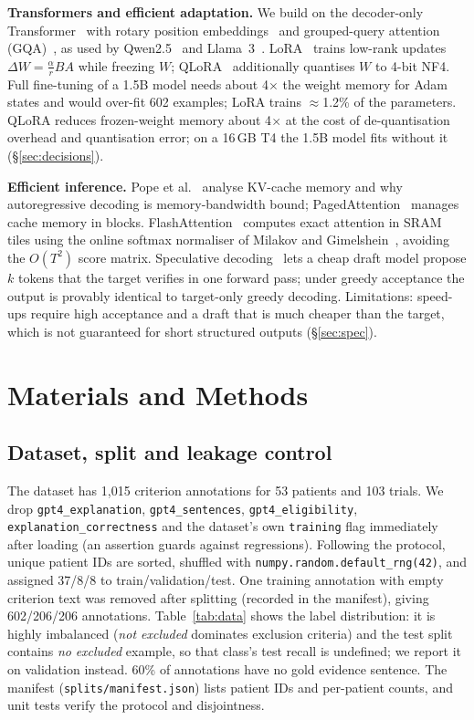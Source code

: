 \documentclass[conference]{IEEEtran}
\begin{document}
\textbf{Transformers and efficient adaptation.} We build on the decoder-only Transformer~\cite{vaswani2017attention} with rotary position embeddings~\cite{su2024roformer} and grouped-query attention (GQA)~\cite{ainslie2023gqa}, as used by Qwen2.5~\cite{qwen2025qwen25} and Llama~3~\cite{dubey2024llama3}. LoRA~\cite{hu2022lora} trains low-rank updates $\Delta W=\tfrac{\alpha}{r}BA$ while freezing $W$; QLoRA~\cite{dettmers2023qlora} additionally quantises $W$ to 4-bit NF4. Full fine-tuning of a 1.5B model needs about 4$\times$ the weight memory for Adam states and would over-fit 602 examples; LoRA trains $\approx$1.2\% of the parameters. QLoRA reduces frozen-weight memory about 4$\times$ at the cost of de-quantisation overhead and quantisation error; on a 16\,GB T4 the 1.5B model fits without it (\S\ref{sec:decisions}).

\textbf{Efficient inference.} Pope et al.~\cite{pope2023efficiently} analyse KV-cache memory and why autoregressive decoding is memory-bandwidth bound; PagedAttention~\cite{kwon2023pagedattention} manages cache memory in blocks. FlashAttention~\cite{dao2022flashattention} computes exact attention in SRAM tiles using the online softmax normaliser of Milakov and Gimelshein~\cite{milakov2018online}, avoiding the $O(T^2)$ score matrix. Speculative decoding~\cite{leviathan2023fast,chen2023accelerating} lets a cheap draft model propose $k$ tokens that the target verifies in one forward pass; under greedy acceptance the output is provably identical to target-only greedy decoding. Limitations: speed-ups require high acceptance and a draft that is much cheaper than the target, which is not guaranteed for short structured outputs (\S\ref{sec:spec}).

\section{Materials and Methods}
\subsection{Dataset, split and leakage control}
The dataset has 1{,}015 criterion annotations for 53 patients and 103 trials. We drop \texttt{gpt4\_explanation}, \texttt{gpt4\_sentences}, \texttt{gpt4\_eligibility}, \texttt{explanation\_correctness} and the dataset's own \texttt{training} flag immediately after loading (an assertion guards against regressions). Following the protocol, unique patient IDs are sorted, shuffled with \texttt{numpy.random.default\_rng(42)}, and assigned 37/8/8 to train/validation/test. One training annotation with empty criterion text was removed after splitting (recorded in the manifest), giving 602/206/206 annotations. Table~\ref{tab:data} shows the label distribution: it is highly imbalanced (\emph{not excluded} dominates exclusion criteria) and the test split contains \emph{no} \emph{excluded} example, so that class's test recall is undefined; we report it on validation instead. 60\% of annotations have no gold evidence sentence. The manifest (\texttt{splits/manifest.json}) lists patient IDs and per-patient counts, and unit tests verify the protocol and disjointness.
\end{document}
